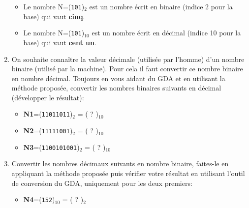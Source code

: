\documentclass{article}
\begin{document}
\begin{enumerate}
\begin{minipage}[b]{.85\linewidth}
\begin{itemize}
	\item Le nombre N=(\texttt{101})$_{2}$ est un nombre écrit en binaire (indice 2 pour la base) qui vaut \textbf{cinq}.
	\item Le nombre N=(\texttt{101})$_{10}$ est un nombre écrit en décimal (indice 10 pour la base) qui vaut \textbf{cent un}.
\end{itemize}
\end{minipage}
	\item On souhaite connaître la valeur décimale (utilisée par l'homme) d'un nombre binaire (utilisé par la machine).
		Pour cela il faut convertir ce nombre binaire en nombre décimal.
		Toujours en vous aidant du GDA et en utilisant la méthode proposée, convertir les nombres binaires suivants en décimal (développer le résultat):\\
		\begin{itemize}
			\item \textbf{N1}=(\texttt{11011011})$_{2}$ = ( ? )$_{10}$\\
\vspace{1em}
\begin{Form}
	\TextField[name=r101,width=\linewidth,height=2.5em,multiline=true,default=N1=]{}
\end{Form}
			\item \textbf{N2}=(\texttt{11111001})$_{2}$ = ( ? )$_{10}$\\
\vspace{1em}
\begin{Form}
	\TextField[name=r102,width=\linewidth,height=2.5em,multiline=true,default=N2=]{}
\end{Form}
			\item \textbf{N3}=(\texttt{1100101001})$_{2}$ = ( ? )$_{10}$\\
\vspace{1em}
\begin{Form}
	\TextField[name=r102,width=\linewidth,height=2.5em,multiline=true,default=N3=]{}
\end{Form}
		\end{itemize}
	\item Convertir les nombres décimaux suivants en nombre binaire, faites-le en appliquant la méthode
		proposée puis vérifier votre résultat en utilisant l'outil de conversion du GDA, uniquement pour les
		deux premiers:
		\begin{itemize}
			\item \textbf{N4}=(\texttt{152})$_{10}$ = ( ? )$_{2}$\\

\end{itemize}
\end{enumerate}
\end{document}
